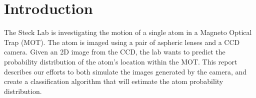\section{Introduction}

The Steck Lab is investigating the motion of a single atom in a Magneto Optical Trap (MOT).  The atom is imaged using a pair of aspheric lenses and a CCD camera.  Given an 2D image from the CCD, the lab wants to predict the probability distribution of the atom's location within the MOT. This report describes our efforts to both simulate the images generated by the camera, and create a classification algorithm that will estimate the atom probability distribution.